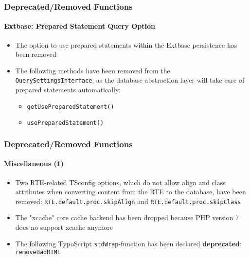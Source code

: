 \begin{frame}[fragile]
	\frametitle{Deprecated/Removed Functions}
	\framesubtitle{Extbase: Prepared Statement Query Option}

	\begin{itemize}

		\item The option to use prepared statements within the Extbase persistence has been removed

		\item The following methods have been removed from the \texttt{QuerySettingsInterface},
			as the database abstraction layer will take care of prepared statements automatically:

			\begin{itemize}
				\item \texttt{getUsePreparedStatement()}
				\item \texttt{usePreparedStatement()}
			\end{itemize}

	\end{itemize}

\end{frame}


\begin{frame}[fragile]
	\frametitle{Deprecated/Removed Functions}
	\framesubtitle{Miscellaneous (1)}

	\begin{itemize}

		\item Two RTE-related TSconfig options, which do not allow align and class attributes when converting
			content from the RTE to the database, have been removed:\newline
			\small
				\texttt{RTE.default.proc.skipAlign} and \texttt{RTE.default.proc.skipClass}
			\normalsize

		\item The "xcache" core cache backend has been dropped because PHP version 7 does no support xcache anymore

		\item The following TypoScript \texttt{stdWrap}-function has been declared \textbf{deprecated}:
			\texttt{removeBadHTML}

	\end{itemize}

\end{frame}

